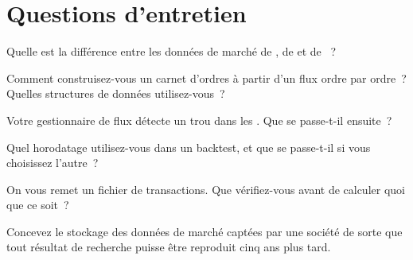 \section{Questions d'entretien}

\begin{interviewq}\label{iq:m1:reading-market-data:1}
Quelle est la différence entre les données de marché de , de  et de ~?
\end{interviewq}

\begin{interviewq}\label{iq:m1:reading-market-data:2}
Comment construisez-vous un carnet d'ordres à partir d'un flux ordre par ordre~?
Quelles structures de données utilisez-vous~?
\end{interviewq}

\begin{interviewq}\label{iq:m1:reading-market-data:3}
Votre gestionnaire de flux détecte un trou dans les . Que se passe-t-il ensuite~?
\end{interviewq}

\begin{interviewq}\label{iq:m1:reading-market-data:4}
Quel horodatage utilisez-vous dans un backtest, et que se passe-t-il si vous choisissez
l'autre~?
\end{interviewq}

\begin{interviewq}\label{iq:m1:reading-market-data:5}
On vous remet un fichier de transactions. Que vérifiez-vous avant de calculer quoi que ce soit~?
\end{interviewq}

\begin{interviewq}\label{iq:m1:reading-market-data:6}
Concevez le stockage des données de marché captées par une société de sorte que tout résultat de recherche
puisse être reproduit cinq ans plus tard.
\end{interviewq}
